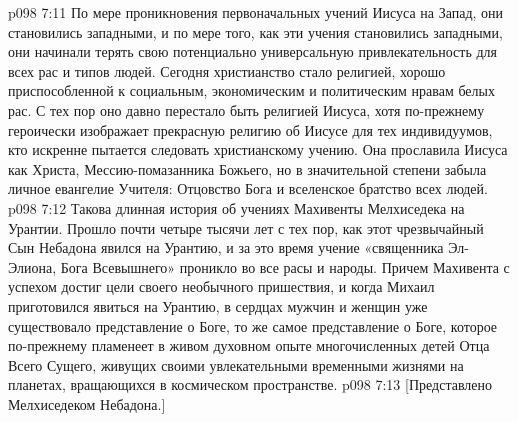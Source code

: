 \vs p098 7:11 \pc По мере проникновения первоначальных учений Иисуса на Запад, они становились западными, и по мере того, как эти учения становились западными, они начинали терять свою потенциально универсальную привлекательность для всех рас и типов людей. Сегодня христианство стало религией, хорошо приспособленной к социальным, экономическим и политическим нравам белых рас. С тех пор оно давно перестало быть религией Иисуса, хотя по\hyp{}прежнему героически изображает прекрасную религию об Иисусе для тех индивидуумов, кто искренне пытается следовать христианскому учению. Она прославила Иисуса как Христа, Мессию\hyp{}помазанника Божьего, но в значительной степени забыла личное евангелие Учителя: Отцовство Бога и вселенское братство всех людей.
\vs p098 7:12 \pc Такова длинная история об учениях Махивенты Мелхиседека на Урантии. Прошло почти четыре тысячи лет с тех пор, как этот чрезвычайный Сын Небадона явился на Урантию, и за это время учение «священника Эл\hyp{}Элиона, Бога Всевышнего» проникло во все расы и народы. Причем Махивента с успехом достиг цели своего необычного пришествия, и когда Михаил приготовился явиться на Урантию, в сердцах мужчин и женщин уже существовало представление о Боге, то же самое представление о Боге, которое по\hyp{}прежнему пламенеет в живом духовном опыте многочисленных детей Отца Всего Сущего, живущих своими увлекательными временными жизнями на планетах, вращающихся в космическом пространстве.
\vsetoff
\vs p098 7:13 [Представлено Мелхиседеком Небадона.]
